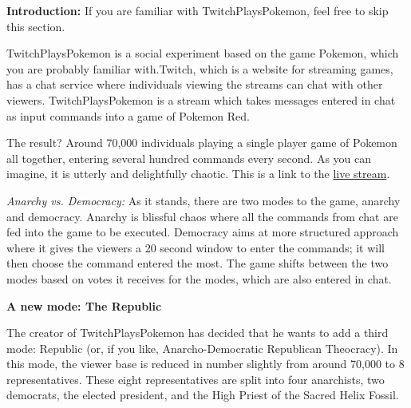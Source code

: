 \documentclass[]{article}
\begin{document}
\begin{qunlist}
{{}}\fi





\textbf{Introduction:} If you are familiar with TwitchPlaysPokemon, feel free to skip this section.

TwitchPlaysPokemon is a social experiment based on the game Pokemon, which you are probably familiar with.Twitch, which is a website for streaming games, has a chat service where individuals viewing the streams can chat with other viewers. TwitchPlaysPokemon is a stream which takes messages entered in chat as input commands into a game of Pokemon Red.

The result? Around 70,000 individuals playing a single player game of Pokemon all together, entering several hundred commands every second. As you can imagine, it is utterly and delightfully chaotic. This is a link to the \href{http://www.twitch.tv/twitchplayspokemon}{live stream}.

\textit{Anarchy vs. Democracy:}
As it stands, there are two modes to the game, anarchy and democracy. Anarchy is blissful chaos where all the commands from chat are fed into the game to be executed. Democracy aims at more structured approach where it gives the viewers a 20 second window to enter the commands; it will then choose the command entered the most. The game shifts between the two modes based on votes it receives for the modes, which are also entered in chat.

\textbf{A new mode: The Republic}

The creator of TwitchPlaysPokemon has decided that he wants to add a third mode: Republic (or, if you like, Anarcho-Democratic Republican Theocracy). 
In this mode, the viewer base is reduced in number slightly from around 70,000 to $8$ representatives. 
These eight representatives are split into four anarchists, two democrats, the elected president, and the High Priest of the Sacred Helix Fossil. 


\end{qunlist}
\end{document}
